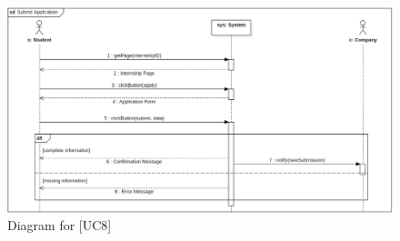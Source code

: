 \begin{figure} [H]
    \centering
    \includegraphics[width=1\linewidth]{Use Cases Images/submit_application.png}
    \caption{Diagram for [UC8]}
    \label{fig: Submit Application Diagram}
\end{figure}


